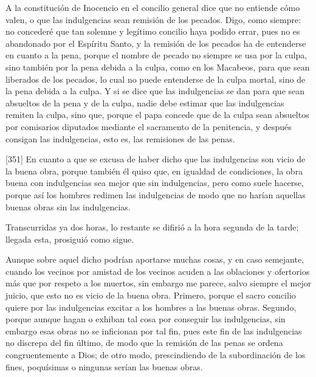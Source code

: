 A la constitución de Inocencio en el concilio general dice que no entiende cómo valen, o que las indulgencias sean remisión de los pecados. Digo, como siempre: no concederé que tan solemne y legítimo concilio haya podido errar, pues no es abandonado por el Espíritu Santo, y la remisión de los pecados ha de entenderse en cuanto a la pena, porque el nombre de pecado no siempre se usa por la culpa, sino también por la pena debida a la culpa, como en los Macabeos, para que sean liberados de los pecados, lo cual no puede entenderse de la culpa mortal, sino de la pena debida a la culpa. Y si se dice que las indulgencias se dan para que sean absueltos de la pena y de la culpa, nadie debe estimar que las indulgencias remiten la culpa, sino que, porque el papa concede que de la culpa sean absueltos por comisarios diputados mediante el sacramento de la penitencia, y después consigan las indulgencias, esto es, las remisiones de las penas.

[351] En cuanto a que se excusa de haber dicho que las indulgencias son vicio de la buena obra, porque también él quiso que, en igualdad de condiciones, la obra buena con indulgencias sea mejor que sin indulgencias, pero como suele hacerse, porque así los hombres redimen las indulgencias de modo que no harían aquellas buenas obras sin las indulgencias.

Transcurridas ya dos horas, lo restante se difirió a la hora segunda de la tarde; llegada esta, prosiguió como sigue.

Aunque sobre aquel dicho podrían aportarse muchas cosas, y en caso semejante, cuando los vecinos por amistad de los vecinos acuden a las oblaciones y ofertorios más que por respeto a los muertos, sin embargo me parece, salvo siempre el mejor juicio, que esto no es vicio de la buena obra. Primero, porque el sacro concilio quiere por las indulgencias excitar a los hombres a las buenas obras. Segundo, porque aunque hagan o exhiban tal cosa por conseguir las indulgencias, sin embargo esas obras no se inficionan por tal fin, pues este fin de las indulgencias no discrepa del fin último, de modo que la remisión de las penas se ordena congruentemente a Dios; de otro modo, prescindiendo de la subordinación de los fines, poquísimas o ningunas serían las buenas obras.

